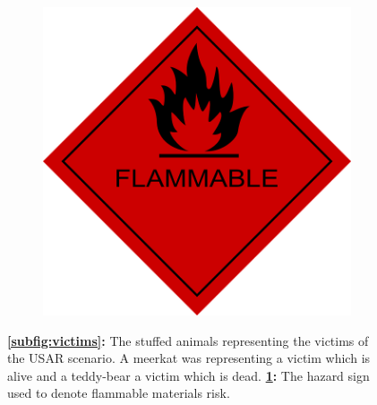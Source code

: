 \documentclass[a4paper,12pt,oneside,openright]{bhamthesis}
\begin{document}
\begin{figure}
\begin{subfigure}[b]{0.45\textwidth}
			\includegraphics[width=\textwidth]{chapter5_fig/flammable.png}
			\caption{}
			\label{subfig:flammable}
		\end{subfigure}
		\hfill
		\caption{ \textbf{\ref{subfig:victims}:} The stuffed animals representing the victims of the USAR scenario. A meerkat was representing a victim which is alive and a teddy-bear a victim which is dead. \textbf{\ref{subfig:flammable}:} The hazard sign used to denote flammable materials risk.}
		\label{fig:flammable_victims}
	\end{figure}
    
\end{document}
